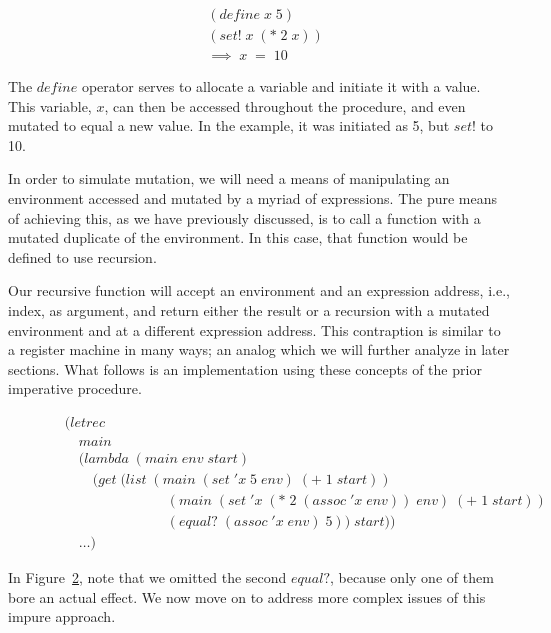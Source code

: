 \begin{figure}[htp]
\caption{}\label{fig:defineSetExample}
\begin{align*}
& (define \; x \; 5)
\\& (set! \; x \; (* \; 2 \; x))
\\& \implies \; x \; = \; 10
\end{align*}
\end{figure}

The $define$ operator serves to allocate a variable and initiate it with a value. 
This variable, $x$, can then be accessed throughout the procedure, and even mutated 
to equal a new value. In the example, it was initiated as 5, but $set!$ to 10.

In order to simulate mutation, we will need a means of manipulating an environment
accessed and mutated by a myriad of expressions. The pure means of achieving this,
as we have previously discussed, is to call a function with a mutated duplicate of
the environment. In this case, that function would be defined to use recursion.

Our recursive function will accept an environment and an expression address, i.e.,
index, as argument, and return either the result or a recursion with a mutated
environment and at a different expression address. This contraption is similar to 
a register machine in many ways; an analog which we will further analyze in later
sections. What follows is an implementation using these concepts of the prior
imperative procedure.

\begin{figure}[htp]
\caption{}\label{fig:recursiveImper}
\begin{align*}
& (letrec \; 
\\& \quad main \; 
\\& \quad (lambda \; (main \; env \; start)
\\& \qquad (get \; (list \; (main \; (set \; 'x \; 5 \; env) \; (+ \; 1 \; start))
\\& \qquad \qquad \qquad \quad \; (main \; (set \; 'x \; (* \; 2 \; (assoc \; 'x \; env)) \; env) \; (+ \; 1 \; start))
\\& \qquad \qquad \qquad \quad \; (equal? \; (assoc \; 'x \; env) \; 5)) \; start))
\\& \quad \dots)
\end{align*}
\end{figure}

In Figure~\ref{fig:recursiveImper}, note that we omitted the second $equal?$,
because only one of them bore an actual effect. We now move on to address more
complex issues of this impure approach.


